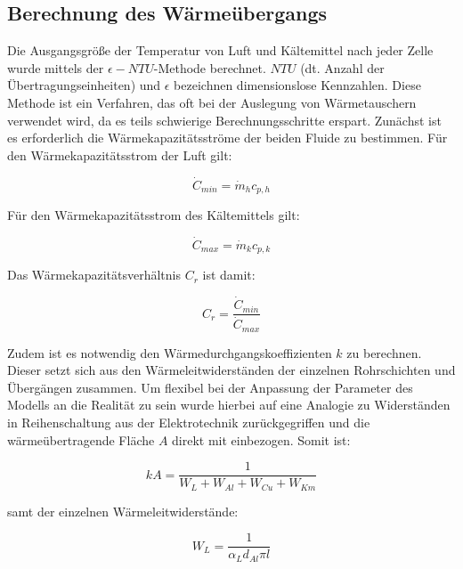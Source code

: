 \subsection{Berechnung des Wärmeübergangs}
\label{subsec:Berechnung des Wärmeübergangs}

Die Ausgangsgröße der Temperatur von Luft und Kältemittel nach jeder Zelle wurde mittels der $\epsilon-NTU$-Methode berechnet\cite{SpringerVerlagGmbH.2013}\cite{Bergman.2011}\cite{Nellis.2009}. $NTU$ (dt. Anzahl der Übertragungseinheiten) und $\epsilon$ bezeichnen dimensionslose Kennzahlen. Diese Methode ist ein Verfahren, das oft bei der Auslegung von Wärmetauschern verwendet wird, da es teils schwierige Berechnungsschritte erspart. Zunächst ist es erforderlich die Wärmekapazitätsströme der beiden Fluide zu bestimmen. Für den Wärmekapazitätsstrom der Luft gilt:

\begin{equation}
\label{eq:25}
\dot{C}_{min} = \dot{m}_h c_{p,h}
\end{equation} 

Für den Wärmekapazitätsstrom des Kältemittels gilt:

\begin{equation}
\label{eq:26}
\dot{C}_{max} = \dot{m}_k c_{p,k}
\end{equation}
 
Das Wärmekapazitätsverhältnis $C_r$ ist damit:
 
\begin{equation}
\label{eq:27}
C_r = \frac{\dot{C}_{min}}{\dot{C}_{max}}
\end{equation}

Zudem ist es notwendig den Wärmedurchgangskoeffizienten $k$ zu berechnen\cite{LehrstuhlfurWarmeundStoffubertragung.}. Dieser setzt sich aus den Wärmeleitwiderständen der einzelnen Rohrschichten und Übergängen zusammen. Um flexibel bei der Anpassung der Parameter des Modells an die Realität zu sein wurde hierbei auf eine Analogie zu Widerständen in Reihenschaltung aus der Elektrotechnik zurückgegriffen und die wärmeübertragende Fläche $A$ direkt mit einbezogen. Somit ist:

\begin{equation}
\label{eq:UA}
kA = \frac{1}{W_{L} + W_{Al} + W_{Cu} + W_{Km}}
\end{equation}
 
samt der einzelnen Wärmeleitwiderstände:

\begin{equation}
\label{eq:28}
W_L = \frac{1}{\alpha_{L} d_{Al} \pi l}
\end{equation}

